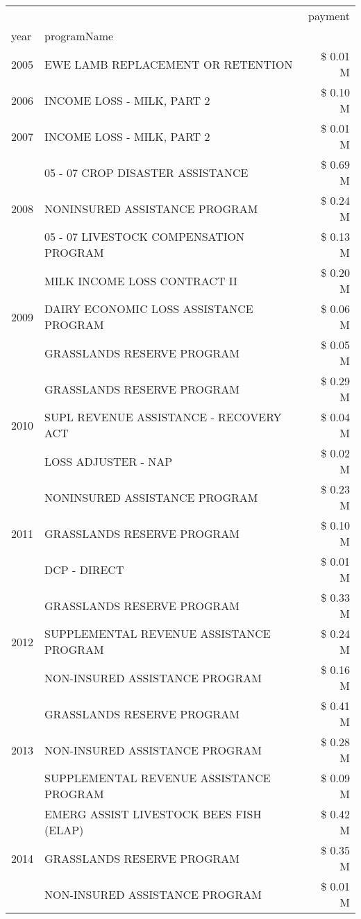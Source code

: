 \begin{tabular}{llr}
\toprule
 &  & payment \\
year & programName &  \\
\midrule
2005 & EWE LAMB REPLACEMENT OR RETENTION & \$ 0.01 M \\
\cline{1-3}
2006 & INCOME LOSS - MILK, PART 2 & \$ 0.10 M \\
\cline{1-3}
2007 & INCOME LOSS - MILK, PART 2 & \$ 0.01 M \\
\cline{1-3}
\multirow[t]{3}{*}{2008} & 05 - 07 CROP DISASTER ASSISTANCE & \$ 0.69 M \\
 & NONINSURED ASSISTANCE PROGRAM & \$ 0.24 M \\
 & 05 - 07 LIVESTOCK COMPENSATION PROGRAM & \$ 0.13 M \\
\cline{1-3}
\multirow[t]{3}{*}{2009} & MILK INCOME LOSS CONTRACT II & \$ 0.20 M \\
 & DAIRY ECONOMIC LOSS ASSISTANCE PROGRAM & \$ 0.06 M \\
 & GRASSLANDS RESERVE PROGRAM & \$ 0.05 M \\
\cline{1-3}
\multirow[t]{3}{*}{2010} & GRASSLANDS RESERVE PROGRAM & \$ 0.29 M \\
 & SUPL REVENUE ASSISTANCE - RECOVERY ACT & \$ 0.04 M \\
 & LOSS ADJUSTER - NAP & \$ 0.02 M \\
\cline{1-3}
\multirow[t]{3}{*}{2011} & NONINSURED ASSISTANCE PROGRAM & \$ 0.23 M \\
 & GRASSLANDS RESERVE PROGRAM & \$ 0.10 M \\
 & DCP - DIRECT & \$ 0.01 M \\
\cline{1-3}
\multirow[t]{3}{*}{2012} & GRASSLANDS RESERVE PROGRAM & \$ 0.33 M \\
 & SUPPLEMENTAL REVENUE ASSISTANCE PROGRAM & \$ 0.24 M \\
 & NON-INSURED ASSISTANCE PROGRAM & \$ 0.16 M \\
\cline{1-3}
\multirow[t]{3}{*}{2013} & GRASSLANDS RESERVE PROGRAM & \$ 0.41 M \\
 & NON-INSURED ASSISTANCE PROGRAM & \$ 0.28 M \\
 & SUPPLEMENTAL REVENUE ASSISTANCE PROGRAM & \$ 0.09 M \\
\cline{1-3}
\multirow[t]{3}{*}{2014} & EMERG ASSIST LIVESTOCK BEES FISH (ELAP) & \$ 0.42 M \\
 & GRASSLANDS RESERVE PROGRAM & \$ 0.35 M \\
 & NON-INSURED ASSISTANCE PROGRAM & \$ 0.01 M \\

\end{tabular}
